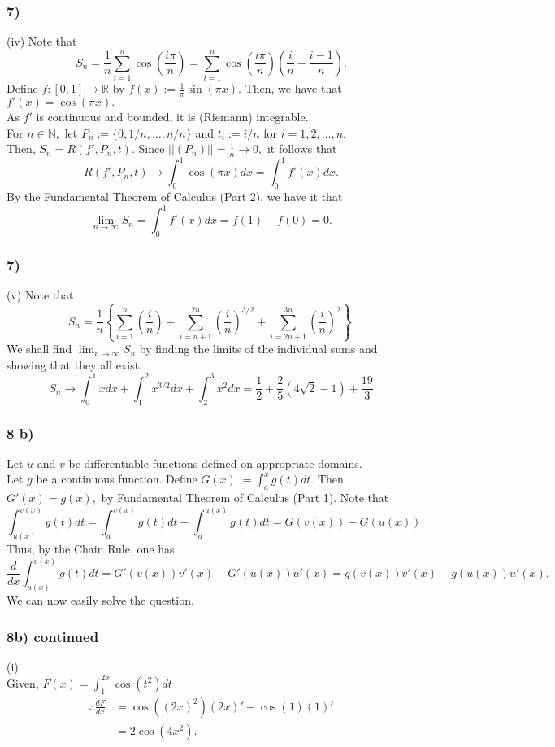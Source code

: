 \documentclass[handout]{beamer}
\begin{document}
\begin{frame}
	\frametitle{7)}
	(iv) Note that \\
	\[S_n = \dfrac{1}{n}\sum_{i=1}^{n}\cos\left(\dfrac{i\pi}{n}\right) = \sum_{i=1}^{n}\cos\left(\dfrac{i\pi}{n}\right)\left(\frac{i}{n} - \frac{i-1}{n}\right) .\]
	Define $f:[0, 1] \to \mathbb{R}$ by $f(x) := \frac{1}{\pi}\sin(\pi x).$ Then, we have that $f'(x) = \cos(\pi x).$\\
	As $f'$ is continuous and bounded, it is (Riemann) integrable. \\
	For $n \in \mathbb{N},$ let $P_n := \{0, 1/n, \ldots, n/n\}$ and $t_i := i/n$ for $i = 1, 2, \ldots, n.$\\
	Then, $S_n = R(f',P_n,t).$ Since $||(P_n)|| = \frac{1}{n} \to 0,$ it follows that
	\[R(f',P_n,t) \to \int_{0}^{1} \cos(\pi x) dx = \int_{0}^{1} f'(x) dx. \]
	By the Fundamental Theorem of Calculus (Part 2), we have it that
	\[\lim_{n\to \infty}S_n = \int_{0}^{1} f'(x) dx = f(1) - f(0) = 0.\]

\end{frame}

\begin{frame}
	\frametitle{7)}
	(v) Note that \\
	\[S_n = \dfrac{1}{n}\left\{\sum_{i=1}^{n}\left(\frac{i}{n}\right) + \sum_{i=n+1}^{2n}\left(\frac{i}{n}\right)^{3/2} + \sum_{i=2n+1}^{3n}\left(\frac{i}{n}\right)^2\right\} .\]
	We shall find $\displaystyle\lim_{n\to \infty}S_n$ by finding the limits of the individual sums and showing that they all exist.\\
	\[S_{n} \rightarrow \int_{0}^{1}xdx + \int_{1}^{2} x^{3/2} dx + \int_{2}^{3} x^{2}dx = \frac{1}{2} + \frac{2}{5}(4\sqrt{2}-1) + \frac{19}{3}  \]
\end{frame}
\begin{frame}
	\frametitle{8 b) }
	Let $u$ and $v$ be differentiable functions defined on appropriate domains.\\
	Let $g$ be a continuous function. Define $G(x) := \displaystyle\int_{a}^{x} g(t) dt.$ Then $G'(x) = g(x),$ by Fundamental Theorem of Calculus (Part 1). Note that
	\[\int_{u(x)}^{v(x)} g(t) dt = \int_{a}^{v(x)} g(t) dt - \int_{a}^{u(x)} g(t) dt = G(v(x)) - G(u(x)).\]
	Thus, by the Chain Rule, one has
	\[\dfrac{d}{dx}\int_{u(x)}^{v(x)} g(t) dt = G'(v(x))v'(x) - G'(u(x))u'(x) = g(v(x))v'(x) - g(u(x))u'(x).\]
	We can now easily solve the question.
\end{frame}


\begin{frame}
	\frametitle{8b) continued}
	(i)\\
	Given, $F(x) = \displaystyle\int_{1}^{2x} \cos(t^2) dt $
	\begin{align*}
		\therefore \frac{dF}{dx} & = \cos\left((2x)^2\right)(2x)' - \cos(1)(1)' \\
		                         & = 2\cos(4x^2).
	\end{align*}
\end{frame}
\end{document}
